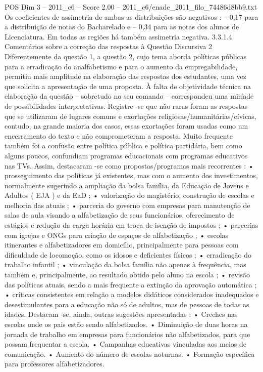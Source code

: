 \begin{textsample}{POS Dim 3 – 2011\_c6 – Score 2.00 – 2011\_c6/enade\_2011\_filo\_74486d8bb9.txt}
Os coeficientes de assimetria de ambas as distribuições são negativos : – 0,17 para a distribuição de notas do Bacharelado e – 0,34 para as notas dos alunos de Licenciatura.
Em todas as regiões há também assimetria negativa. 3.3.1.4 Comentários sobre a correção das respostas à Questão Discursiva 2 Diferentemente da questão 1, a questão 2, cujo tema aborda políticas públicas para a erradicação do analfabetismo e para o aumento da empregabilidade, permitiu mais amplitude na elaboração das respostas dos estudantes, uma vez que solicita a apresentação de uma proposta.
À falta de objetividade técnica na elaboração da questão – sobretudo no seu comando – correspondeu uma miríade de possibilidades interpretativas.
Registre -se que não raras foram as respostas que se utilizaram de lugares comuns e exortações religiosas/humanitárias/cívicas, contudo, na grande maioria dos casos, essas exortações foram usadas como um encerramento do texto e não comprometeram a resposta.
Muito frequente também foi a confusão entre política pública e política partidária, bem como alguns poucos, confundiam programas educacionais com programas educativos nas TVs.
Assim, destacaram -se como propostas/programas mais recorrentes : • prosseguimento das políticas já existentes, mas com o aumento dos investimentos, normalmente sugerindo a ampliação da bolsa família, da Educação de Jovens e Adultos ( EJA ) e da EaD ; • valorização do magistério, construção de escolas e melhoria das atuais ; • parceria do governo com empresas para manutenção de salas de aula visando a alfabetização de seus funcionários, oferecimento de estágios e redução da carga horária em troca de isenção de impostos ; • parcerias com igrejas e ONGs para criação de espaços de alfabetização ; • escolas itinerantes e alfabetizadores em domicílio, principalmente para pessoas com dificuldade de locomoção, como os idosos e deficientes físicos ; • erradicação do trabalho infantil ; • vinculação da bolsa família não apenas à frequência, mas também e, principalmente, ao resultado obtido pelo aluno na escola ; • revisão das políticas atuais, sendo a mais frequente a extinção da aprovação automática ; • críticas consistentes em relação a modelos didáticos considerados inadequados e desestimulantes para a educação não só de adultos, mas de pessoas de todas as idades.
Destacam -se, ainda, outras sugestões apresentadas : • Creches nas escolas onde os pais estão sendo alfabetizados. • Diminuição de duas horas na jornada de trabalho em empresas para funcionários não alfabetizados, para que possam frequentar a escola. • Campanhas educativas vinculadas aos meios de comunicação. • Aumento do número de escolas noturnas. • Formação específica para professores alfabetizadores.

\end{textsample}
